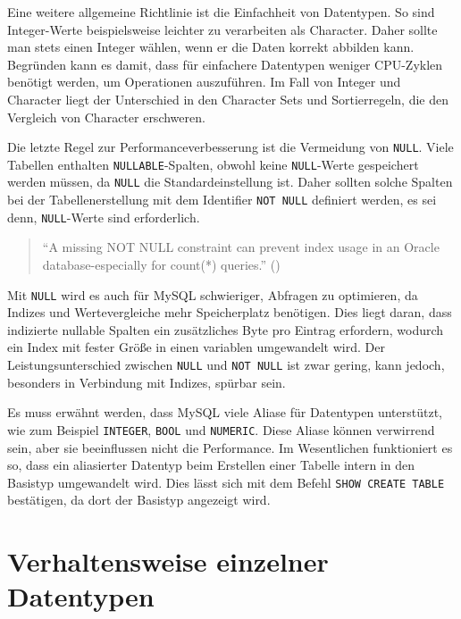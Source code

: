 Eine weitere allgemeine Richtlinie ist die Einfachheit von Datentypen.
So sind Integer-Werte beispielsweise leichter zu verarbeiten als Character.
Daher sollte man stets einen Integer wählen, wenn er die Daten korrekt abbilden kann.
Begründen kann es damit, dass für einfachere Datentypen weniger CPU-Zyklen benötigt werden, um Operationen auszuführen.
Im Fall von Integer und Character liegt der Unterschied in den Character Sets und Sortierregeln, die den Vergleich von Character erschweren.

Die letzte Regel zur Performanceverbesserung ist die Vermeidung von \texttt{NULL}.
Viele Tabellen enthalten \texttt{NULLABLE}-Spalten, obwohl keine \texttt{NULL}-Werte gespeichert werden müssen, da \texttt{NULL} die Standardeinstellung ist.
Daher sollten solche Spalten bei der Tabellenerstellung mit dem Identifier \texttt{NOT NULL} definiert werden, es sei denn, \texttt{NULL}-Werte sind erforderlich.

\begin{quote}
    \enquote{A missing NOT NULL constraint can prevent index usage in an Oracle database-especially for count(*) queries.} (\cite[S. 57]{winand2011sql})
\end{quote}

Mit \texttt{NULL} wird es auch für MySQL schwieriger, Abfragen zu optimieren, da Indizes und Wertevergleiche mehr Speicherplatz benötigen.
Dies liegt daran, dass indizierte nullable Spalten ein zusätzliches Byte pro Eintrag erfordern, wodurch ein Index mit fester Größe in einen variablen umgewandelt wird.
Der Leistungsunterschied zwischen \texttt{NULL} und \texttt{NOT NULL} ist zwar gering, kann jedoch, besonders in Verbindung mit Indizes, spürbar sein.

Es muss erwähnt werden, dass MySQL viele Aliase für Datentypen unterstützt, wie zum Beispiel \texttt{INTEGER}, \texttt{BOOL} und \texttt{NUMERIC}.
Diese Aliase können verwirrend sein, aber sie beeinflussen nicht die Performance.
Im Wesentlichen funktioniert es so, dass ein aliasierter Datentyp beim Erstellen einer Tabelle intern in den Basistyp umgewandelt wird.
Dies lässt sich mit dem Befehl \texttt{SHOW CREATE TABLE} bestätigen, da dort der Basistyp angezeigt wird.

\section{Verhaltensweise einzelner Datentypen}\label{sec:data-types-verhaltensweise-einzelner-datentypen}

